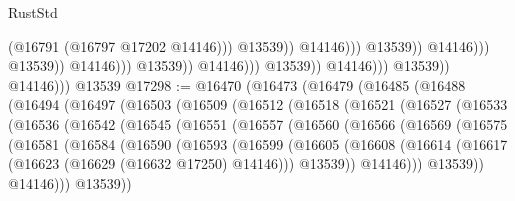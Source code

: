 \begin{lexlean}{RustStd}
\begin{coremodule}
                                                                  (@16791 (@16797 @17202 @14146)))
                                                                @13539))
                                                            @14146)))
                                                      @13539))
                                                  @14146)))
                                            @13539))
                                        @14146)))
                                  @13539))
                              @14146)))
                        @13539))
                    @14146)))
              @13539))
          @14146)))
    @13539
@17298 := @16470
    (@16473
      (@16479
        (@16485
          (@16488
            (@16494
              (@16497
                (@16503
                  (@16509
                    (@16512
                      (@16518
                        (@16521
                          (@16527
                            (@16533
                              (@16536
                                (@16542
                                  (@16545
                                    (@16551
                                      (@16557
                                        (@16560
                                          (@16566
                                            (@16569
                                              (@16575
                                                (@16581
                                                  (@16584
                                                    (@16590
                                                      (@16593
                                                        (@16599
                                                          (@16605
                                                            (@16608
                                                              (@16614
                                                                (@16617
                                                                  (@16623
                                                                    (@16629
                                                                      (@16632 @17250)
                                                                      @14146)))
                                                                @13539))
                                                            @14146)))
                                                      @13539))
                                                  @14146)))
                                            @13539))

\end{coremodule}
\end{lexlean}
